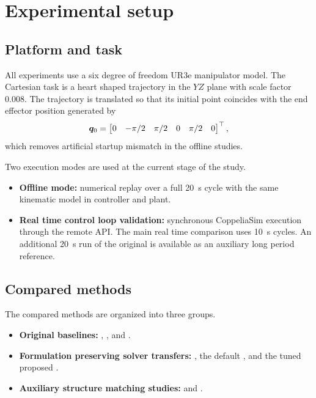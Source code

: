 \section{Experimental setup}

\subsection{Platform and task}

All experiments use a six degree of freedom UR3e manipulator model. The Cartesian task is a heart shaped trajectory in the $YZ$ plane with scale factor $0.008$. The trajectory is translated so that its initial point coincides with the end effector position generated by
\begin{equation}
  \bm{q}_0 =
  \begin{bmatrix}
    0 & -\pi/2 & \pi/2 & 0 & \pi/2 & 0
  \end{bmatrix}^{\top},
\end{equation}
which removes artificial startup mismatch in the offline studies.

Two execution modes are used at the current stage of the study.
\begin{itemize}[leftmargin=1.5em]
  \item \textbf{Offline mode:} numerical replay over a full \SI{20}{\second} cycle with the same kinematic model in controller and plant.
  \item \textbf{Real time control loop validation:} synchronous CoppeliaSim execution through the remote API. The main real time comparison uses \SI{10}{\second} cycles. An additional \SI{20}{\second} run of the original \methodthree{} is available as an auxiliary long period reference.
\end{itemize}

\subsection{Compared methods}

The compared methods are organized into three groups.
\begin{itemize}[leftmargin=1.5em]
  \item \textbf{Original baselines:} \methodone{}, \methodtwo{}, and \methodthree{}.
  \item \textbf{Formulation preserving solver transfers:} \methodoneDL{}, the default \methodtwoDL{}, and the tuned proposed \methodtwoDL{}.
  \item \textbf{Auxiliary structure matching studies:} \methodthreelcc{} and \methodthreepcg{}.
\end{itemize}

